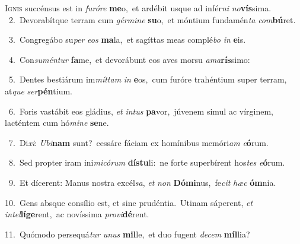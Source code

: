 \lettrine{\initial\textcolor{\initialcolor}{I}}{gnis} succénsus est in \textit{fu}\-\textit{ró}\textit{re} \textbf{me}\-o,~\star et ardébit usque ad infér\textit{ni} \textit{no}\-\textbf{vís}sima.\\
{\numbfont\textcolor{\numbcolor}{~2.}}~Devorabítque terram cum \textit{gér}\-\textit{mi}\textit{ne} \textbf{su}\-o,~\star et móntium fundamén\textit{ta} \textit{com}\-\textbf{bú}ret.\par
{\numbfont\textcolor{\numbcolor}{~3.}}~Congregábo su\textit{per} \textit{e}\-\textit{os} \textbf{ma}\-la,~\star et sagíttas meas complé\textit{bo} \textit{in} \textbf{e}\-is.\par
{\numbfont\textcolor{\numbcolor}{~4.}}~Con\-\textit{su}\-\textit{mén}\textit{tur} \textbf{fa}\-me,~\star et devorábunt eos aves morsu \textit{a}\-\textit{ma}\textbf{rís}simo:\par
{\numbfont\textcolor{\numbcolor}{~5.}}~Dentes bestiárum im\-\textit{mít}\-\textit{tam} \textit{in} \textbf{e}\-os,~\star cum furóre trahéntium super terram, at\textit{que} \textit{ser}\-\textbf{pén}tium.\par
{\numbfont\textcolor{\numbcolor}{~6.}}~Foris vastábit eos gládius, \textit{et} \textit{in}\-\textit{tus} \textbf{pa}\-vor,~\star júvenem simul ac vírginem, lacténtem cum hó\-\textit{mi}\-\textit{ne} \textbf{se}\-ne.\par
{\numbfont\textcolor{\numbcolor}{~7.}}~Di\-\textit{xi}\-: \textit{U}\-\textit{bi}\textbf{nam} sunt?~\star cessáre fáciam ex homínibus memóri\textit{am} \textit{e}\-\textbf{ó}rum.\par
{\numbfont\textcolor{\numbcolor}{~8.}}~Sed propter iram ini\-\textit{mi}\-\textit{có}\textit{rum} \textbf{dís}\-\textbf{tu}li:~\star ne forte superbírent hos\textit{tes} \textit{e}\-\textbf{ó}rum.\par
{\numbfont\textcolor{\numbcolor}{~9.}}~Et dícerent: Manus nostra excél\-\textit{sa}\-, \textit{et} \textit{non} \textbf{Dó}\-\textbf{mi}nus,~\star fe\textit{cit} \textit{hæc} \textbf{óm}\-nia.\par
{\numbfont\textcolor{\numbcolor}{10.}}~Gens absque consílio est, et sine prudéntia.~\dagger Utinam sáperent, \textit{et} \textit{in}\-\textit{tel}\textbf{lí}\textbf{ge}rent,~\star ac novíssima \textit{pro}\-\textit{vi}\textbf{dé}rent.\par
{\numbfont\textcolor{\numbcolor}{11.}}~Quómodo persequá\textit{tur} \textit{u}\-\textit{nus} \textbf{mil}\-le,~\star et duo fugent \textit{de}\-\textit{cem} \textbf{míl}\-lia?\par
